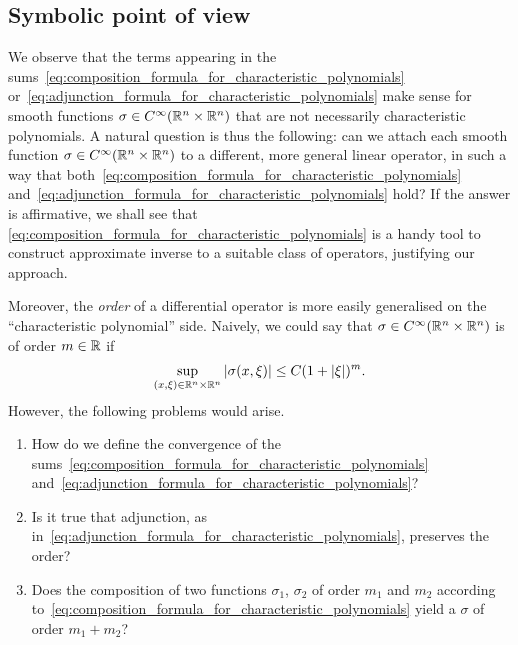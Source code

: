 \subsection{Symbolic point of view}

We observe that
the terms appearing in the sums~\eqref{eq:composition_formula_for_characteristic_polynomials} or~\eqref{eq:adjunction_formula_for_characteristic_polynomials} make sense for smooth functions $\sigma \in {C^\infty(\mathbb{R}^n \times \mathbb{R}^n)}$ that are not necessarily characteristic polynomials.
A natural question is thus the following:
can we attach each smooth function $\sigma \in {C^\infty(\mathbb{R}^n \times \mathbb{R}^n)}$ to a different, more general linear operator,
in such a way that both~\eqref{eq:composition_formula_for_characteristic_polynomials} and~\eqref{eq:adjunction_formula_for_characteristic_polynomials} hold?
If the answer is affirmative,
we shall see that
\eqref{eq:composition_formula_for_characteristic_polynomials} is a handy tool to construct approximate inverse to a suitable class of operators,
justifying our approach.

Moreover,
the \emph{order} of a differential operator is more easily generalised on the ``characteristic polynomial'' side.
Naively, we could say that $\sigma \in {C^\infty(\mathbb{R}^n \times \mathbb{R}^n)}$ is of order $m \in \mathbb{R}$ if
\begin{align*}
    \sup_{(x, \xi) \in \mathbb{R}^n \times \mathbb{R}^n} \left|{\sigma(x, \xi)}\right| \leq C (1 + \left|{\xi}\right|)^m.
\end{align*}
However,
the following problems would arise.
\begin{enumerate}
    \item How do we define the convergence of the sums~\eqref{eq:composition_formula_for_characteristic_polynomials} and~\eqref{eq:adjunction_formula_for_characteristic_polynomials}?
    \item Is it true that adjunction, as in~\eqref{eq:adjunction_formula_for_characteristic_polynomials}, preserves the order?
    \item Does the composition of two functions $\sigma_1$, $\sigma_2$ of order $m_1$ and $m_2$ according to~\eqref{eq:composition_formula_for_characteristic_polynomials} yield a $\sigma$ of order $m_1 + m_2$?
\end{enumerate}


